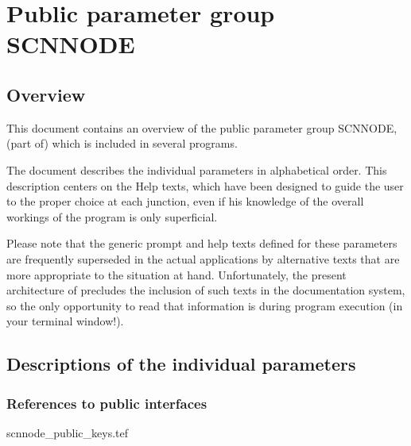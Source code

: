 
\chapter{ Public parameter group SCNNODE}
\tableofcontents


\section{ Overview}

	This document contains an overview of the public parameter group
SCNNODE, (part of) which is included in several \NEWSTAR programs.



	The
document describes the individual parameters in alphabetical order. This
description centers on the Help texts, which have been designed to guide the
user to the proper choice at each junction, even if his knowledge of the
overall workings of the program is only superficial.

	Please note that the generic prompt and help texts defined for these
parameters are frequently superseded in the actual applications by alternative
texts that are more appropriate to the situation at hand. Unfortunately, the
present architecture of \NEWSTAR precludes the inclusion of such texts in the
documentation system, so the only opportunity to read that information is
during program execution (in your terminal window!).


\section{ Descriptions of the individual parameters}
\label{.descriptions}

\subsection{ References to public interfaces}
\label{.public}

 {scnnode_public_keys.tef}
